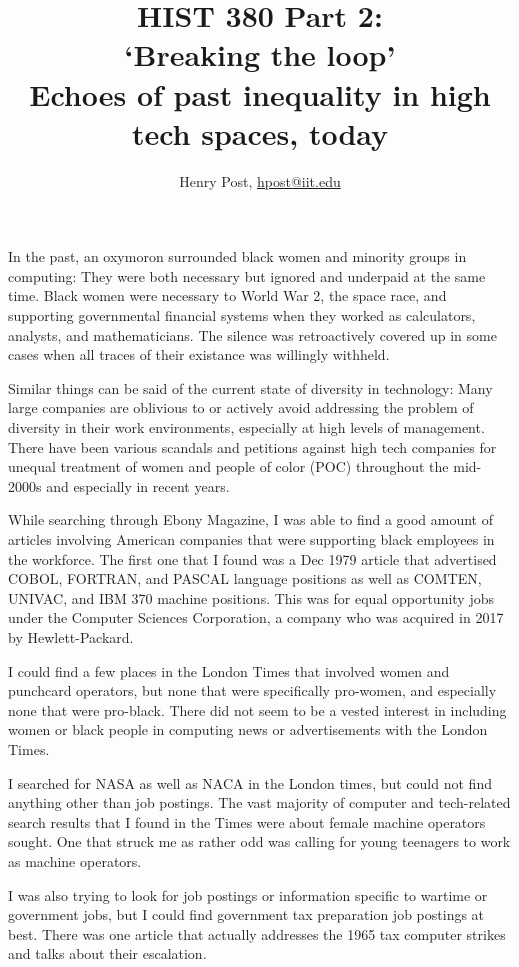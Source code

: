 \documentclass[a4paper,12pt]{article}
\title{HIST 380 Part 2: \\ `Breaking the loop' \\ Echoes of past inequality in high tech spaces, today }
\author{Henry Post, \url{hpost@iit.edu}}
\begin{document}
\maketitle

\newpage

In the past, an oxymoron surrounded black women and minority groups in computing: They were both necessary but ignored and underpaid at the same time. Black women were necessary to World War 2, the space race, and supporting governmental financial systems when they worked as calculators, analysts, and mathematicians. The silence was retroactively covered up in some cases when all traces of their existance was willingly withheld.

Similar things can be said of the current state of diversity in technology: Many large companies are oblivious to or actively avoid addressing the problem of diversity in their work environments, especially at high levels of management. There have been various scandals and petitions against high tech companies for unequal treatment of women and people of color (POC) throughout the mid-2000s and especially in recent years.

While searching through Ebony Magazine, I was able to find a good amount of articles involving American companies that were supporting black employees in the workforce. The first one that I found was a Dec 1979 article\cite{csc} that advertised COBOL, FORTRAN, and PASCAL language positions as well as COMTEN, UNIVAC, and IBM 370 machine positions. This was for equal opportunity jobs under the Computer Sciences Corporation, a company who was acquired in 2017 by Hewlett-Packard.

I could find a few places in the London Times that involved women and punchcard operators, but none that were specifically pro-women, and especially none that were pro-black. There did not seem to be a vested interest in including women or black people in computing news or advertisements with the London Times.

I searched for NASA as well as NACA in the London times, but could not find anything other than job postings. The vast majority of computer and tech-related search results that I found in the Times were about female machine operators sought. One that struck me as rather odd was calling for young teenagers to work as machine operators\cite{youngmachineop}.

I was also trying to look for job postings or information specific to wartime or government jobs, but I could find government tax preparation job postings at best. There was one article that actually addresses the 1965 tax computer strikes \cite{taxstrikes} and talks about their escalation.
\end{document}

